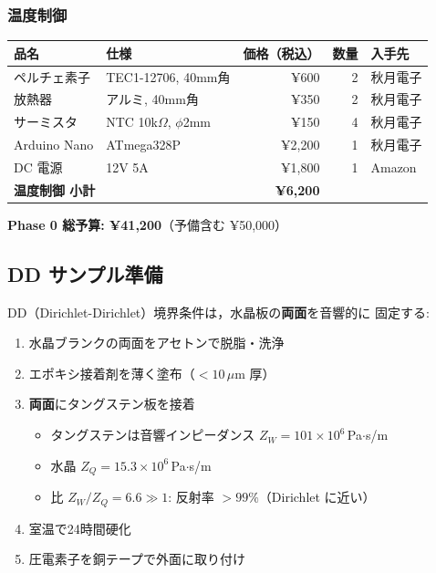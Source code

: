 \documentclass[11pt,a4paper]{article}
\begin{document}
\subsubsection{温度制御}

\begin{center}
\small
\begin{tabular}{llrrl}
\toprule
品名 & 仕様 & 価格（税込） & 数量 & 入手先 \\
\midrule
ペルチェ素子 & TEC1-12706, 40mm角 & ¥600 & 2 & 秋月電子 \\
放熱器 & アルミ, 40mm角 & ¥350 & 2 & 秋月電子 \\
サーミスタ & NTC 10k$\Omega$, $\phi$2mm & ¥150 & 4 & 秋月電子 \\
Arduino Nano & ATmega328P & ¥2,200 & 1 & 秋月電子 \\
DC 電源 & 12V 5A & ¥1,800 & 1 & Amazon \\
\midrule
\multicolumn{2}{l}{\textbf{温度制御 小計}} & \textbf{¥6,200} & & \\
\bottomrule
\end{tabular}
\end{center}

\begin{center}
\large
\textbf{Phase 0 総予算: ¥41,200}（予備含む ¥50,000）
\end{center}

\subsection{DD サンプル準備}

DD（Dirichlet-Dirichlet）境界条件は，水晶板の\textbf{両面}を音響的に
固定する:

\begin{enumerate}
\item 水晶ブランクの両面をアセトンで脱脂・洗浄
\item エポキシ接着剤を薄く塗布（$< 10\,\mu$m 厚）
\item \textbf{両面}にタングステン板を接着
  \begin{itemize}
  \item タングステンは音響インピーダンス $Z_W = 101\times10^6$\,Pa$\cdot$s/m
  \item 水晶 $Z_Q = 15.3\times10^6$\,Pa$\cdot$s/m
  \item 比 $Z_W/Z_Q = 6.6 \gg 1$: 反射率 $> 99\%$（Dirichlet に近い）
  \end{itemize}
\item 室温で24時間硬化
\item 圧電素子を銅テープで外面に取り付け
\end{enumerate}
\end{document}
